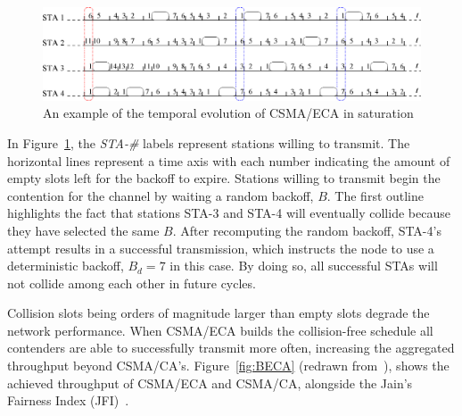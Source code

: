 \documentclass[a4paper,journal]{IEEEtran}
\begin{document}
\begin{figure}[tb]
\centering
  \includegraphics[width=0.8\linewidth]{figures/basicECA.eps}
  \caption{An example of the temporal evolution of CSMA/ECA in saturation}
  \label{fig:BECA-example}
\end{figure}

In Figure~\ref{fig:BECA-example}, the \emph{STA-\#} labels represent stations willing to transmit. The horizontal lines represent a time axis with each number indicating the amount of empty slots left for the backoff to expire. Stations willing to transmit begin the contention for the channel by waiting a random backoff, $B$. The first outline highlights the fact that stations STA-3 and STA-4 will eventually collide because they have selected the same $B$. After recomputing the random backoff, STA-4's attempt results in a successful transmission, which instructs the node to use a deterministic backoff, $B_{d}=7$ in this case. By doing so, all successful STAs will not collide among each other in future cycles.

Collision slots being orders of magnitude larger than empty slots degrade the network performance. When CSMA/ECA builds the collision-free schedule all contenders are able to successfully transmit more often, increasing the aggregated throughput beyond CSMA/CA's. Figure~\ref{fig:BECA} (redrawn from~\cite{research2standards}), shows the achieved throughput of CSMA/ECA and CSMA/CA, alongside the Jain's Fairness Index (JFI)~\cite{JFI}.
\end{document}
